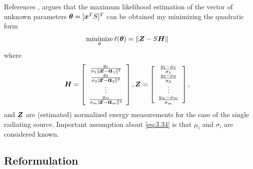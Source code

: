 References \cite{ShengHu}, \cite{LiHu} argues that the maximum likelihood estimation of the vector of unknown parameters $\mbox{\boldmath${\theta}$} = [\mbox{\boldmath$x$}^T S]^T$ can be obtained my minimizing the quadratic form
\begin{equation} \label{eq:3.34}
\mathop{\mbox{minimize}}_\theta \ell(\mbox{\boldmath${\theta}$}) = \|\mbox{\boldmath$Z$} - S\mbox{\boldmath$H$}\|
\end{equation}
where 
\begin{equation}
\nonumber
\mbox{\boldmath$H$} = \left[ \begin{array}{c}
\frac{g_1}{\sigma_1\|\mbox{\boldmath$x$} - \mbox{\boldmath$a$}_1 \|^2} \\
\frac{g_2}{\sigma_2|\mbox{\boldmath$x$} - \mbox{\boldmath$a$}_2 \|^2} \\
\vdots \\
\frac{g_m}{\sigma_m|\mbox{\boldmath$x$} - \mbox{\boldmath$a$}_m \|^2} \\
\end{array}
\right] ,
\nonumber
\mbox{\boldmath$Z$} = \left[ \begin{array}{c}
\frac{y_1 - \mu_1}{\sigma_1} \\
\frac{y_2 - \mu_2}{\sigma_2} \\
\vdots \\
\frac{y_m - \mu_m}{\sigma_m} \\
\end{array}
\right] ,
\end{equation}
and $\mbox{\boldmath$Z$}$ are (estimated) normalized energy measurements for the case of the single radiating source. Important assumption about \ref{eq:3.34} is that $\mu_i$ and $\sigma_i$ are considered known. 


\subsection{Reformulation}

